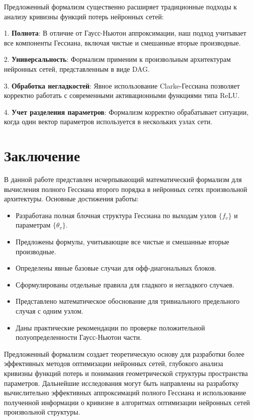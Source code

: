 \documentclass[11pt]{article}
\begin{document}
Предложенный формализм существенно расширяет традиционные подходы к анализу кривизны функций потерь нейронных сетей:

1. \textbf{Полнота}: В отличие от Гаусс-Ньютон аппроксимации, наш подход учитывает все компоненты Гессиана,
включая чистые и смешанные вторые производные.

2. \textbf{Универсальность}: Формализм применим к произвольным архитектурам нейронных сетей, представленным в виде DAG.

3. \textbf{Обработка негладкостей}: Явное использование Clarke-Гессиана позволяет корректно работать с
современными активационными функциями типа ReLU.

4. \textbf{Учет разделения параметров}: Формализм корректно обрабатывает ситуации, когда один вектор
параметров используется в нескольких узлах сети.

\section{Заключение}

В данной работе представлен исчерпывающий математический формализм для вычисления полного Гессиана второго
порядка в нейронных сетях произвольной архитектуры. Основные достижения работы:

\begin{itemize}
  \item Разработана полная блочная структура Гессиана по выходам узлов $\{f_v\}$ и параметрам $\{\theta_v\}$.
  \item Предложены формулы, учитывающие все чистые и смешанные вторые производные.
  \item Определены явные базовые случаи для офф-диагональных блоков.
  \item Сформулированы отдельные правила для гладкого и негладкого случаев.
  \item Представлено математическое обоснование для тривиального предельного случая с одним узлом.
  \item Даны практические рекомендации по проверке положительной полуопределенности Гаусс-Ньютон части.
\end{itemize}

Предложенный формализм создает теоретическую основу для разработки более эффективных методов оптимизации
нейронных сетей, глубокого анализа кривизны функций потерь и понимания геометрической структуры пространства
параметров. Дальнейшие исследования могут быть направлены на разработку вычислительно эффективных
аппроксимаций полного Гессиана и использование полученной информации о кривизне в алгоритмах оптимизации
нейронных сетей произвольной структуры.
\end{document}
